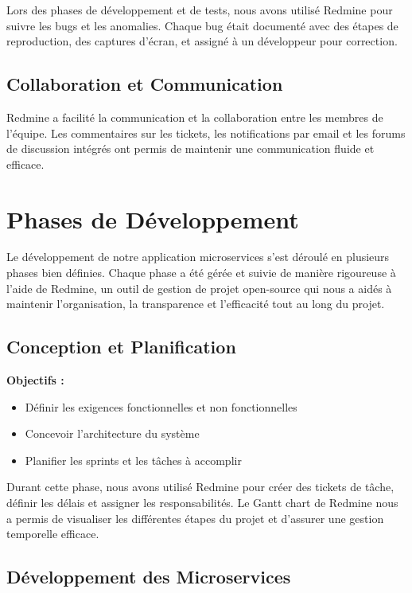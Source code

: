 \documentclass[a4paper, 11pt, openany]{report}
\begin{document}
Lors des phases de développement et de tests, nous avons utilisé Redmine pour suivre les bugs et les anomalies. Chaque bug était documenté avec des étapes de reproduction, des captures d'écran, et assigné à un développeur pour correction.

\subsection{Collaboration et Communication}

Redmine a facilité la communication et la collaboration entre les membres de l'équipe. Les commentaires sur les tickets, les notifications par email et les forums de discussion intégrés ont permis de maintenir une communication fluide et efficace.


\newpage

\section{Phases de Développement}

Le développement de notre application microservices s'est déroulé en plusieurs phases bien définies. Chaque phase a été gérée et suivie de manière rigoureuse à l'aide de Redmine, un outil de gestion de projet open-source qui nous a aidés à maintenir l'organisation, la transparence et l'efficacité tout au long du projet.

\subsection{Conception et Planification}

\textbf{Objectifs :}
\begin{itemize}
    \item Définir les exigences fonctionnelles et non fonctionnelles
    \item Concevoir l'architecture du système
    \item Planifier les sprints et les tâches à accomplir
\end{itemize}

Durant cette phase, nous avons utilisé Redmine pour créer des tickets de tâche, définir les délais et assigner les responsabilités. Le Gantt chart de Redmine nous a permis de visualiser les différentes étapes du projet et d'assurer une gestion temporelle efficace.

\subsection{Développement des Microservices}
\end{document}
